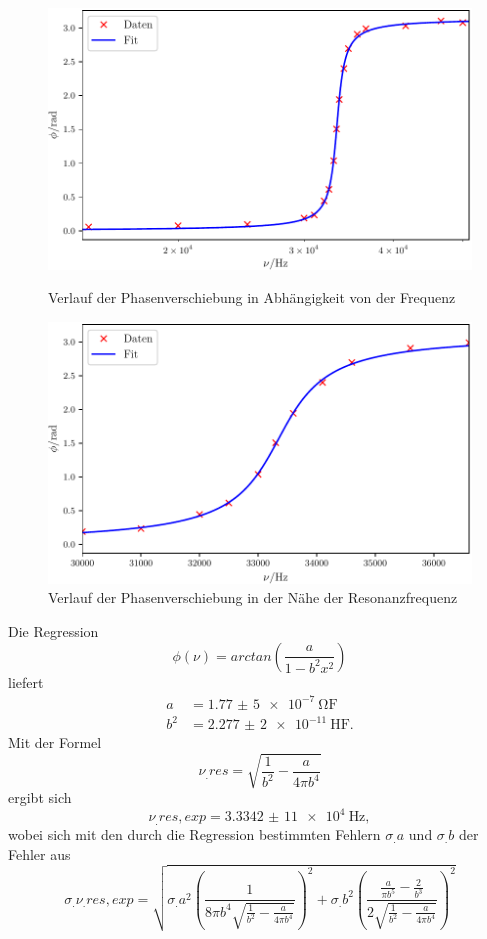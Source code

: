 \begin{figure}
\centering
\includegraphics[scale=0.8]{content/images/Graphd1.pdf}
\caption{Verlauf der Phasenverschiebung in Abhängigkeit von der Frequenz}
\label{fig:abb4}
\includegraphics[scale=0.8]{content/images/Graphd2.pdf}
\caption{Verlauf der Phasenverschiebung in der Nähe der Resonanzfrequenz}
\label{fig:abb5}
\end{figure}
Die Regression 
\[
\phi(\nu)=arctan\left(\frac{a}{1-b^2x^2}\right)
\]
liefert
\begin{align*}
a&=\SI{1,77(5)e-7}{\ohm\farad} \\
b^2&=\SI{2,277(2)e-11}{\henry\farad}\text{.}
\end{align*}
Mit der Formel
\[
\nu_.{res}=\sqrt{\frac{1}{b^2}-\frac{a}{4\pi b^4}}
\]
ergibt sich 
\[
\nu_.{res,exp}=\SI{3,3342(11)e4}{\hertz},
\]
wobei sich mit den durch die Regression bestimmten Fehlern $\sigma_.a$ und $\sigma_.b$ der Fehler aus
\[
\sigma_.{\nu_.{res},exp}=\sqrt{\sigma_.a^2\left(\frac{1}{8\pi b^4\sqrt{\frac{1}{b^2}-\frac{a}{4\pi b^4}}}\right)^2+\sigma_.b^2\left(\frac{\frac{a}{\pi b^5}-\frac{2}{b^3}}{2\sqrt{\frac{1}{b^2}-\frac{a}{4\pi b^4}}}\right)^2}
\]
